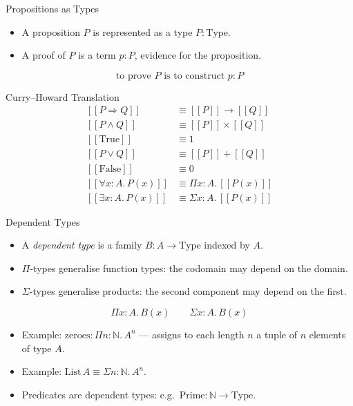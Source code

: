 \documentclass[aspectratio=169,11pt]{beamer}
\newcommand{\interp}[1]{[\![#1]\!]}
\begin{document}
\begin{frame}{Propositions as Types}
  \begin{itemize}
    \item A proposition \(P\) is represented as a type \(P : \mathrm{Type}\).
    \item A proof of \(P\) is a term \(p : P\), evidence for the proposition.
  \end{itemize}

  \vspace{0.4em}
  \[
    \text{to prove } P \text{ is to construct } p : P
  \]
\end{frame}

\begin{frame}{Curry--Howard Translation}
  \[
  \begin{aligned}
  \interp{P \Rightarrow Q} &\equiv \interp{P} \to \interp{Q} \\
  \interp{P \wedge Q} &\equiv \interp{P} \times \interp{Q} \\
  \interp{\mathrm{True}} &\equiv 1 \\
  \interp{P \vee Q} &\equiv \interp{P} + \interp{Q} \\
  \interp{\mathrm{False}} &\equiv 0 \\
  \interp{\forall x : A.\,P(x)} &\equiv \Pi x : A.\,\interp{P(x)} \\
  \interp{\exists x : A.\,P(x)} &\equiv \Sigma x : A.\,\interp{P(x)}
  \end{aligned}
  \]
\end{frame}

\begin{frame}{Dependent Types}
  \begin{itemize}
    \item A \textit{dependent type} is a family \(B : A \to \mathrm{Type}\) indexed by \(A\).
    \item \(\Pi\)-types generalise function types: the codomain may depend on the domain.
    \item \(\Sigma\)-types generalise products: the second component may depend on the first.
  \end{itemize}

  \vspace{0.4em}
  \[
    \Pi x : A.\, B(x)
    \qquad
    \Sigma x : A.\, B(x)
  \]

  \vspace{0.4em}
  \begin{itemize}
    \item Example: \(\mathrm{zeroes} : \Pi n : \mathbb{N}.\, A^n\) --- assigns to each length \(n\) a tuple of \(n\) elements of type \(A\).
    \item Example: \(\mathrm{List}\,A \equiv \Sigma n : \mathbb{N}.\, A^n\).
    \item Predicates are dependent types: e.g.\ \(\mathrm{Prime} : \mathbb{N} \to \mathrm{Type}\).
  \end{itemize}
\end{frame}
\end{document}
